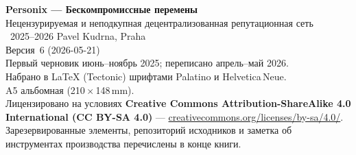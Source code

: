 \thispagestyle{empty}
\ifdefined\printmode\vspace*{\fill}\else{}\fi
\begin{flushleft}\small\sffamily
\textbf{Personix --- Бескомпромиссные перемены}\\[0.3em]
Нецензурируемая и неподкупная децентрализованная репутационная сеть\\[1.4em]

\textcopyright\ 2025--2026 Pavel Kudrna, Praha\\[0.4em]

Версия~6 (2026-05-21)\\
Первый черновик июнь--ноябрь 2025; переписано апрель--май 2026.\\[1.4em]

Набрано в \LaTeX{} (Tectonic) шрифтами Palatino и Helvetica\,Neue.\\
A5 альбомная (210\,$\times$\,148\,mm).\\[1.4em]

Лицензировано на условиях \textbf{Creative Commons Attribution-ShareAlike 4.0
International (CC BY-SA 4.0)} ---
\href{https://creativecommons.org/licenses/by-sa/4.0/}{creativecommons.org/licenses/by-sa/4.0/}.
Зарезервированные элементы, репозиторий исходников и заметка об инструментах
производства перечислены в конце книги.
\end{flushleft}
\ifdefined\printmode\else{}\fi
\clearpage
